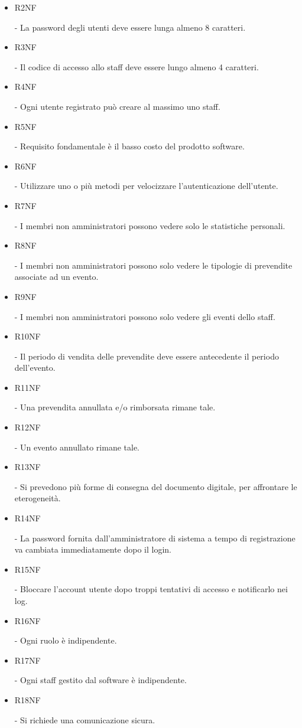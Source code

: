 \documentclass[a4paper]{article}
\begin{document}
\begin{itemize}
	\item \hypertarget{R2NF}{R2NF} - La password degli utenti deve essere lunga almeno 8 caratteri.
	\item \hypertarget{R3NF}{R3NF} - Il codice di accesso allo staff deve essere lungo almeno 4 caratteri.
	\item \hypertarget{R4NF}{R4NF} - Ogni utente registrato può creare al massimo uno staff.
	\item \hypertarget{R5NF}{R5NF} - Requisito fondamentale è il basso costo del prodotto software.
	\item \hypertarget{R6NF}{R6NF} - Utilizzare uno o più metodi per velocizzare l'autenticazione dell'utente.
	\item \hypertarget{R7NF}{R7NF} - I membri non amministratori possono vedere solo le statistiche personali.	
	\item \hypertarget{R8NF}{R8NF} - I membri non amministratori possono solo vedere le tipologie di prevendite associate ad un evento.
	\item \hypertarget{R9NF}{R9NF} - I membri non amministratori possono solo vedere gli eventi dello staff.
	\item \hypertarget{R10NF}{R10NF} - Il periodo di vendita delle prevendite deve essere antecedente il periodo dell'evento.
	\item \hypertarget{R11NF}{R11NF} - Una prevendita annullata e/o rimborsata rimane tale.
	\item \hypertarget{R12NF}{R12NF} - Un evento annullato rimane tale.
	\item \hypertarget{R13NF}{R13NF} - Si prevedono più forme di consegna del documento digitale, per affrontare le eterogeneità.
	\item \hypertarget{R14NF}{R14NF} - La password fornita dall'amministratore di sistema a tempo di registrazione va cambiata immediatamente dopo il login.
	
	\item \hypertarget{R15NF}{R15NF} - Bloccare l'account utente dopo troppi tentativi di accesso e notificarlo nei log.
	
	\item \hypertarget{R16NF}{R16NF} - Ogni ruolo è indipendente.
	\item \hypertarget{R17NF}{R17NF} - Ogni staff gestito dal software è indipendente.
	
	\item \hypertarget{R18NF}{R18NF} - Si richiede una comunicazione sicura.
	

\end{itemize}
\end{document}
